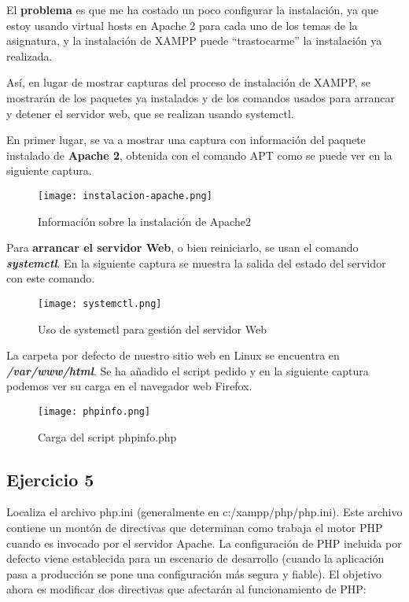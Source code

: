 El \textbf{problema }es que me ha costado un poco configurar la instalación, ya que estoy usando virtual hosts en Apache 2 para cada uno de los temas de la asignatura, y la instalación de XAMPP puede ``trastocarme'' la instalación ya realizada.

Así, en lugar de mostrar capturas del proceso de instalación de XAMPP, se mostrarán de los paquetes ya instalados y de los comandos usados para arrancar y detener el servidor web, que se realizan usando systemctl.

En primer lugar, se va a mostrar una captura con información del paquete instalado de \textbf{Apache 2}, obtenida con el comando APT como se puede ver en la siguiente captura.

\begin{figure}[H]
    \centering
    \texttt{[image: instalacion-apache.png]}
    \caption{Información sobre la instalación de Apache2}
\end{figure}

Para \textbf{arrancar el servidor Web}, o bien reiniciarlo, se usan el comando \textit{\textbf{systemctl}}. En la siguiente captura se muestra la salida del estado del servidor con este comando.

\begin{figure}[H]
    \centering
    \texttt{[image: systemctl.png]}
    \caption{Uso de systemctl para gestión del servidor Web}
\end{figure}

La carpeta por defecto de nuestro sitio web en Linux se encuentra en \textbf{\textit{/var/www/html}}. Se ha añadido el script pedido y en la siguiente captura podemos ver su carga en el navegador web Firefox.

\begin{figure}[H]
    \centering
    \texttt{[image: phpinfo.png]}
    \caption{Carga del script phpinfo.php}
\end{figure}

\subsection{Ejercicio 5}
Localiza el archivo php.ini (generalmente en c:/xampp/php/php.ini). Este archivo contiene un montón de directivas que determinan como trabaja el motor PHP cuando es invocado por el servidor Apache. La configuración de PHP incluida por defecto viene establecida para un escenario de desarrollo (cuando la aplicación pasa a producción se pone una configuración más segura y fiable). El objetivo ahora es modificar dos directivas que afectarán al funcionamiento de PHP:

